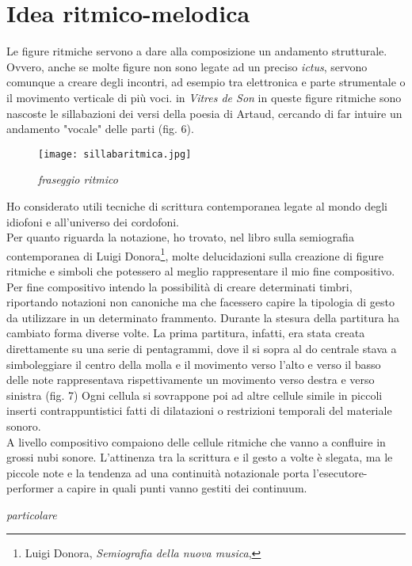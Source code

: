 \section{Idea ritmico-melodica}

Le figure ritmiche servono a dare alla composizione un andamento strutturale. Ovvero, anche se molte figure non sono legate ad un preciso \textit{ictus}, servono comunque a creare degli incontri, ad esempio tra elettronica e parte strumentale o il movimento verticale di più voci. in \textit{Vitres de Son} in queste figure ritmiche sono nascoste le sillabazioni dei versi della poesia di Artaud, cercando di far intuire un andamento "vocale" delle parti (fig. 6). \\
 \begin{figure}[htbp]
        \centering
        \texttt{[image: sillabaritmica.jpg]}
          \small{\caption{\textit{fraseggio ritmico}}}
\end{figure}
Ho considerato utili tecniche di scrittura contemporanea legate al mondo degli idiofoni e all'universo dei cordofoni. \\
Per quanto riguarda la notazione, ho trovato, nel libro sulla semiografia contemporanea di Luigi Donora\footnote{Luigi Donora, \textit{Semiografia della nuova musica}, }, molte delucidazioni sulla creazione di figure ritmiche e simboli che potessero al meglio rappresentare il mio fine compositivo. Per fine compositivo intendo la possibilità di creare determinati timbri, riportando notazioni non canoniche ma che facessero capire la tipologia di gesto da utilizzare in un determinato frammento. Durante la stesura della partitura ha cambiato forma diverse volte. La prima partitura, infatti, era stata creata direttamente su una serie di pentagrammi, dove il si sopra al do centrale stava a simboleggiare il centro della molla e il movimento verso l'alto e verso il basso delle note rappresentava rispettivamente un movimento verso destra e verso sinistra (fig. 7)
Ogni cellula si sovrappone poi ad altre cellule simile in piccoli inserti contrappuntistici fatti di dilatazioni o restrizioni temporali del materiale sonoro. \\
A livello compositivo compaiono delle cellule ritmiche che vanno a confluire in grossi nubi sonore. L'attinenza tra la scrittura e il gesto a volte è slegata, ma le piccole note e la tendenza ad una continuità notazionale porta l'esecutore-performer a capire in quali punti vanno gestiti dei continuum. \\
\begin{floatingfigure}{10cm}
\mbox{}
\small{\caption{\textit{particolare}}}
\end{floatingfigure}


